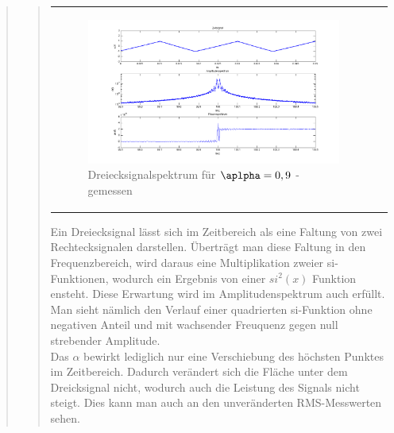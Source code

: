 \begin{quote}
\begin{quote}
\begin{center}
\begin{tabular}{ll}
\begin{minipage}{0.6\textwidth}
                    \begin{figure}[H]
                        \label{fig:}            
                        \includegraphics[scale=0.3]{./Bilder/drei_alpha9_-_gemessen.png} %
                        \caption{Dreiecksignalspektrum für $\aplpha = 0,9$ - gemessen}
                    \end{figure}                
                
                \end{minipage}
                        
            \end{tabular}
            \end{center}
            
            Ein Dreiecksignal lässt sich im Zeitbereich als eine Faltung von
            zwei Rechtecksignalen darstellen. Überträgt man diese Faltung in den
            Frequenzbereich, wird daraus eine Multiplikation zweier
            si-Funktionen, wodurch ein Ergebnis von einer $si^2(x)$ Funktion
            ensteht. Diese Erwartung wird im Amplitudenspektrum auch erfüllt.
            Man sieht nämlich den Verlauf einer quadrierten si-Funktion ohne
            negativen Anteil und mit wachsender Freuquenz gegen null strebender
            Amplitude.\\
            
            Das $\alpha$ bewirkt lediglich nur eine Verschiebung des höchsten
            Punktes im Zeitbereich. Dadurch verändert sich die Fläche unter dem
            Dreicksignal nicht, wodurch auch die Leistung des Signals nicht
            steigt. Dies kann man auch an den unveränderten RMS-Messwerten
            sehen.
           
                     

\end{quote}
\end{quote}
